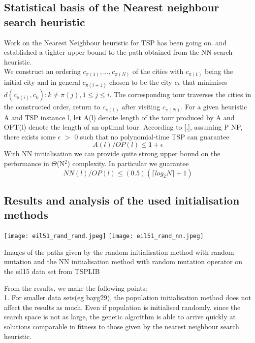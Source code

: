 \documentclass{article}
\begin{document}
\subsection{Statistical basis of the Nearest neighbour search heuristic}
Work on the Nearest Neighbour heuristic for TSP has been going on. \cite{hurkens2004nearest} and \cite{hougardy2015nearest} established a tighter upper bound to the  path obtained from the NN search heuristic. 
\\We construct an ordering $c_{\pi(1)} ,..., c_{\pi(N)}$ of  the cities with $c_{\pi(1)}$  being the initial city and in general $c_{\pi(i+1)}$  chosen to be the city $c_{k}$ that minimises ${d(c_{\pi(i)},c_{k}): k \neq \pi(j), 1 \leq j \leq i}$. The corresponding tour traverses the cities in the constructed order, return to $c_{\pi(1)}$ after visiting $c_{\pi(N)}$. For a given heuristic A and TSP instance l, let A(l) denote length of the tour produced by A and OPT(l) denote the length of an optimal tour. According to [.], assuming P \neq NP, there exists some $\epsilon$ $>$ 0 such that no polynomial-time TSP can guarantee\[ A(l)/OP(l) \leq 1+ \epsilon \]
With NN initialisation we can provide quite strong upper bound on the performance in $\Theta$(N$^2$) complexity. In particular we guarantee \[ NN(l)/OP(l) \leq (0.5)(\lceil log_{2}N \rceil + 1) \]

\subsection{Results and analysis of the used initialisation methods}

\begin{minipage}{6in}
  \centering
  \texttt{[image: eil51\_rand\_rand.jpeg]}
  \hspace*{.2in}
  \texttt{[image: eil51\_rand\_nn.jpeg]}
\end{minipage}
Images of the paths given by the random initialisation method with random mutation and the NN initialisation method with random mutation operator on the eil15 data set from TSPLIB

\vspace{5mm}
From the results, we make the following points:
\\1.  For smaller data sets(eg bayg29), the population initialisation method does not affect the results as much. Even if population is initialised randomly, since the search space is not as large, the genetic algorithm is able to arrive quickly at solutions comparable in fitness to those given by the nearest neighbour search heuristic.
\end{document}
